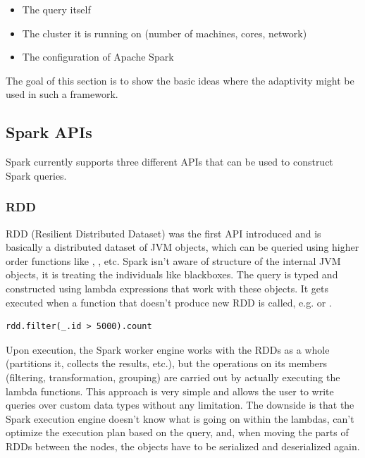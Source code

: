 \begin{itemize}
	\item The query itself
	\item The cluster it is running on (number of machines, cores, network)
	\item The configuration of Apache Spark
\end{itemize}

The goal of this section is to show the basic ideas where the adaptivity might be used in such a framework.

\subsection{Spark APIs}
\label{subsec:spark_apis}

Spark currently supports three different APIs that can be used to construct Spark queries.

\subsubsection{RDD}

RDD (Resilient Distributed Dataset) was the first API introduced and is basically a distributed dataset of JVM objects, which can be queried using higher order functions like , , etc. Spark isn't aware of structure of the internal JVM objects, it is treating the individuals like blackboxes. The query is typed and constructed using lambda expressions that work with these objects. It gets executed when a function that doesn't produce new RDD is called, e.g.  or . 

\lstset{style=Scala}
\begin{lstlisting}
rdd.filter(_.id > 5000).count
\end{lstlisting}

Upon execution, the Spark worker engine works with the RDDs as a whole (partitions it, collects the results, etc.), but the operations on its members (filtering, transformation, grouping) are carried out by actually executing the lambda functions. This approach is very simple and allows the user to write queries over custom data types without any limitation. The downside is that the Spark execution engine doesn't know what is going on within the lambdas, can't optimize the execution plan based on the query, and, when moving the parts of RDDs between the nodes, the objects have to be serialized and deserialized again.

